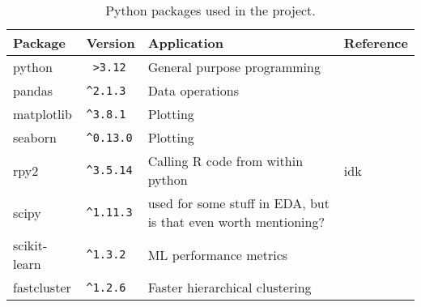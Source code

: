 \begin{table}[H]
    \centering
    \begin{tabular}{|p{2.5cm}||p{2cm}|p{3cm}|p{5cm}|}
        \hline
        \textbf{Package} & \textbf{Version} & \textbf{Application} & \textbf{Reference} \\
        \hline
        \hline
        python & \verb| >3.12| & General purpose programming & \cite{python} \\
        \hline
        pandas & \verb|^2.1.3| & Data operations & \cite{python:pandas} \\
        \hline
        matplotlib & \verb|^3.8.1| & Plotting & \cite{python:plt} \\
        \hline
        seaborn & \verb|^0.13.0| & Plotting & \cite{python:sns} \\
        \hline
        rpy2 & \verb|^3.5.14| & Calling R code from within python & idk \\
        \hline
        scipy & \verb|^1.11.3| & used for some stuff in EDA, but is that even worth mentioning? & \cite{python:scipy} \\
        \hline
        scikit-learn & \verb|^1.3.2| & ML performance metrics & \cite{python:scikit-learn} \\
        \hline
        fastcluster & \verb|^1.2.6| & Faster hierarchical clustering & \cite{python:fastcluster} \\
        \hline
    \end{tabular}
    \caption{Python packages used in the project.}
    \label{tab:python_packages}
\end{table}
